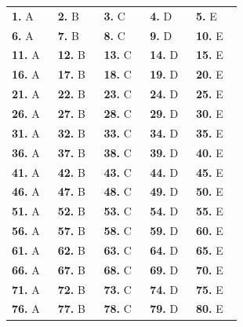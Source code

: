 \documentclass[10pt,a4paper,full]{physicsquiz}
\begin{document}
\quizselectall
\let\storedquizmarks\quizmarks
\let\storedquizdifficulty\quizdifficulty
\renewcommand{\quizmarks}[1]{}
\renewcommand{\quizdifficulty}[1]{}
\printquizquestions[2]
\let\quizmarks\storedquizmarks
\let\quizdifficulty\storedquizdifficulty

\begin{quizanswerkeycontent}
  \clearpage
  \begin{answerkey}
    \centering
    \renewcommand{\arraystretch}{1.25}
    \begin{tabular}{*{5}{>{\centering\arraybackslash}p{0.17\linewidth}}}
      \toprule
      \textbf{1.} A & \textbf{2.} B & \textbf{3.} C & \textbf{4.} D & \textbf{5.} E \\
      \textbf{6.} A & \textbf{7.} B & \textbf{8.} C & \textbf{9.} D & \textbf{10.} E \\
      \textbf{11.} A & \textbf{12.} B & \textbf{13.} C & \textbf{14.} D & \textbf{15.} E \\
      \textbf{16.} A & \textbf{17.} B & \textbf{18.} C & \textbf{19.} D & \textbf{20.} E \\
      \textbf{21.} A & \textbf{22.} B & \textbf{23.} C & \textbf{24.} D & \textbf{25.} E \\
      \textbf{26.} A & \textbf{27.} B & \textbf{28.} C & \textbf{29.} D & \textbf{30.} E \\
      \textbf{31.} A & \textbf{32.} B & \textbf{33.} C & \textbf{34.} D & \textbf{35.} E \\
      \textbf{36.} A & \textbf{37.} B & \textbf{38.} C & \textbf{39.} D & \textbf{40.} E \\
      \textbf{41.} A & \textbf{42.} B & \textbf{43.} C & \textbf{44.} D & \textbf{45.} E \\
      \textbf{46.} A & \textbf{47.} B & \textbf{48.} C & \textbf{49.} D & \textbf{50.} E \\
      \textbf{51.} A & \textbf{52.} B & \textbf{53.} C & \textbf{54.} D & \textbf{55.} E \\
      \textbf{56.} A & \textbf{57.} B & \textbf{58.} C & \textbf{59.} D & \textbf{60.} E \\
      \textbf{61.} A & \textbf{62.} B & \textbf{63.} C & \textbf{64.} D & \textbf{65.} E \\
      \textbf{66.} A & \textbf{67.} B & \textbf{68.} C & \textbf{69.} D & \textbf{70.} E \\
      \textbf{71.} A & \textbf{72.} B & \textbf{73.} C & \textbf{74.} D & \textbf{75.} E \\
      \textbf{76.} A & \textbf{77.} B & \textbf{78.} C & \textbf{79.} D & \textbf{80.} E \\

\end{tabular}
\end{answerkey}
\end{quizanswerkeycontent}
\end{document}
